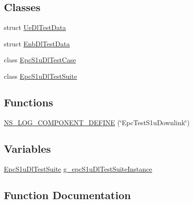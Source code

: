 \subsection*{Classes}
\begin{DoxyCompactItemize}
\item 
struct \hyperlink{structUeDlTestData}{Ue\+Dl\+Test\+Data}
\item 
struct \hyperlink{structEnbDlTestData}{Enb\+Dl\+Test\+Data}
\item 
class \hyperlink{classEpcS1uDlTestCase}{Epc\+S1u\+Dl\+Test\+Case}
\item 
class \hyperlink{classEpcS1uDlTestSuite}{Epc\+S1u\+Dl\+Test\+Suite}
\end{DoxyCompactItemize}
\subsection*{Functions}
\begin{DoxyCompactItemize}
\item 
\hyperlink{epc-test-s1u-downlink_8cc_ab19c7226fcbeedff7d50ad5abffd9792}{N\+S\+\_\+\+L\+O\+G\+\_\+\+C\+O\+M\+P\+O\+N\+E\+N\+T\+\_\+\+D\+E\+F\+I\+NE} (\char`\"{}Epc\+Test\+S1u\+Downlink\char`\"{})
\end{DoxyCompactItemize}
\subsection*{Variables}
\begin{DoxyCompactItemize}
\item 
\hyperlink{classEpcS1uDlTestSuite}{Epc\+S1u\+Dl\+Test\+Suite} \hyperlink{epc-test-s1u-downlink_8cc_a5ebc1ffeec976a49e826eaeb5522ae64}{g\+\_\+epc\+S1u\+Dl\+Test\+Suite\+Instance}
\end{DoxyCompactItemize}


\subsection{Function Documentation}
